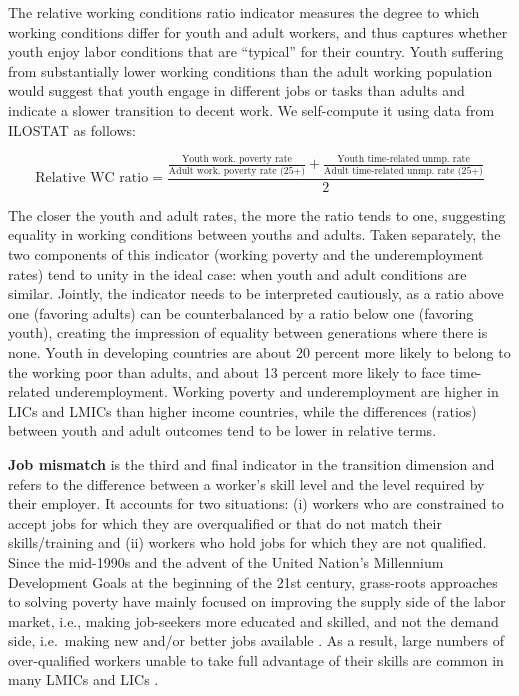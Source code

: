 \documentclass[
  a4paper, twoside, 12pt]{book}
\begin{document}
The relative working conditions ratio indicator measures the degree to which working conditions differ for youth and adult workers, and thus captures whether youth enjoy labor conditions that are ``typical'' for their country. Youth suffering from substantially lower working conditions than the adult working population would suggest that youth engage in different jobs or tasks than adults and indicate a slower transition to decent work. We self-compute it using data from ILOSTAT as follows:

\footnotesize

\[ \text{Relative WC ratio}= \frac{\displaystyle{\frac{\text{Youth work. poverty rate}}{\text{Adult work. poverty rate (25+)}}} + \displaystyle{\frac{\text{Youth time-related unmp. rate}}{\text{Adult time-related unmp. rate (25+)}}}}{2} \]
\normalsize
\vspace*{5pt}

The closer the youth and adult rates, the more the ratio tends to one, suggesting equality in working conditions between youths and adults. Taken separately, the two components of this indicator (working poverty and the underemployment rates) tend to unity in the ideal case: when youth and adult conditions are similar. Jointly, the indicator needs to be interpreted cautiously, as a ratio above one (favoring adults) can be counterbalanced by a ratio below one (favoring youth), creating the impression of equality between generations where there is none. Youth in developing countries are about 20 percent more likely to belong to the working poor than adults, and about 13 percent more likely to face time-related underemployment. Working poverty and underemployment are higher in LICs and LMICs than higher income countries, while the differences (ratios) between youth and adult outcomes tend to be lower in relative terms.

\textbf{Job mismatch} is the third and final indicator in the transition dimension and refers to the difference between a worker's skill level and the level required by their employer. It accounts for two situations: (i) workers who are constrained to accept jobs for which they are overqualified or that do not match their skills/training and (ii) workers who hold jobs for which they are not qualified. Since the mid-1990s and the advent of the United Nation's Millennium Development Goals at the beginning of the 21st century, grass-roots approaches to solving poverty have mainly focused on improving the supply side of the labor market, i.e., making job-seekers more educated and skilled, and not the demand side, i.e.~making new and/or better jobs available \autocite{amsden2010,gore2010}. As a result, large numbers of over-qualified workers unable to take full advantage of their skills are common in many LMICs and LICs \autocite{handel2016}.
\end{document}
